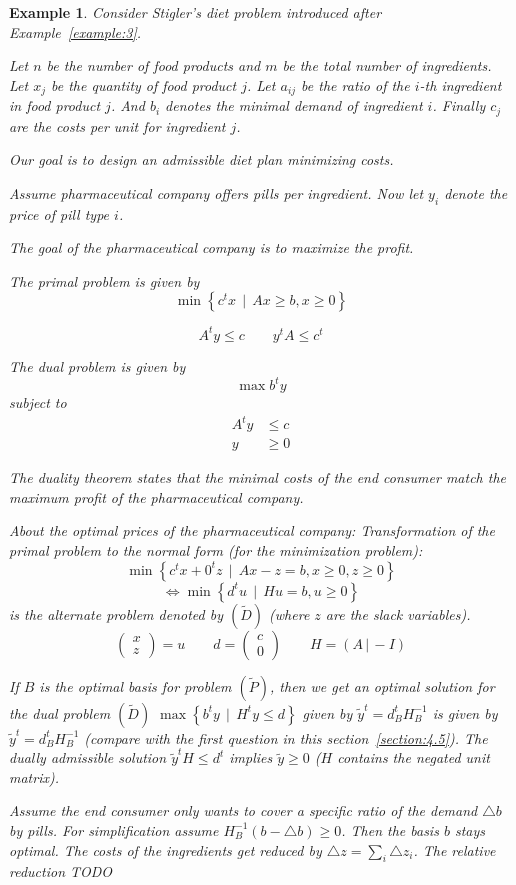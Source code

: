\documentclass[a4paper]{article}
\numberwithin{lecref}{section}
\newcounter{exercises}
\newtheorem{example}[exercises]{Example}
\newcommand{\SetDef}[2]{\left\{#1\,\mid\,#2\right\}}
\begin{document}
\begin{example}
	Consider Stigler's diet problem introduced after Example~\ref{example:3}.

	Let $n$ be the number of food products and $m$ be the total number of ingredients.
	Let $x_j$ be the quantity of food product $j$.
	Let $a_{ij}$ be the ratio of the $i$-th ingredient in food product $j$.
	And $b_i$ denotes the minimal demand of ingredient $i$.
	Finally $c_j$ are the costs per unit for ingredient $j$.

	Our goal is to design an admissible diet plan minimizing costs.

	Assume pharmaceutical company offers pills per ingredient.
	Now let $y_i$ denote the price of pill type $i$.

	The goal of the pharmaceutical company is to maximize the profit.

	The primal problem is given by
	\[ \min\SetDef{c^t x}{Ax \geq b, x \geq 0} \]

	\[ A^t y \leq c \qquad y^t A \leq c^t \]

	The dual problem is given by
	\[ \max b^t y \]
	subject to
	\begin{align*}
		A^t y &\leq c \\
		y &\geq 0
	\end{align*}

	The duality theorem states that the minimal costs of the end consumer match the maximum profit of the pharmaceutical company.

	About the optimal prices of the pharmaceutical company:
	Transformation of the primal problem to the normal form (for the minimization problem):
	\[ \min\SetDef{c^tx + 0^t z}{Ax - z = b, x \geq 0, z \geq 0} \]
	\[ \iff \min\SetDef{d^t u}{Hu = b, u \geq 0} \]
	is the alternate problem denoted by $(\tilde D)$ (where $z$ are the slack variables).
	\[ \begin{pmatrix} x \\ z \end{pmatrix} = u \qquad d = \begin{pmatrix} c \\ 0 \end{pmatrix} \qquad H = (A \,|\, -I) \]

	If $B$ is the optimal basis for problem $(\tilde P)$, then we get an optimal solution for the dual problem $(\tilde D)$ $\max\SetDef{b^ty}{H^t y \leq d}$ given by $\tilde y^t = d_B^t H_B^{-1}$ is given by $\tilde y^t = d_B^t H_B^{-1}$ (compare with the first question in this section~\ref{section:4.5}). The dually admissible solution $\tilde y^t H \leq d^t$ implies $\tilde y \geq 0$ ($H$ contains the negated unit matrix).

	Assume the end consumer only wants to cover a specific ratio of the demand $\triangle b$ by pills.
	For simplification assume $H_B^{-1}(b - \triangle b) \geq 0$. Then the basis $b$ stays optimal.
	The costs of the ingredients get reduced by $\triangle z = \sum_i \triangle z_i$.
	The relative reduction
	TODO
\end{example}

\printindex
\end{document}

